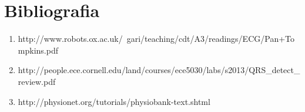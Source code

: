 \chapter{Bibliografia}

\vspace*{1cm}

\begin{enumerate}[\lbrack 1\rbrack]
	\item http://www.robots.ox.ac.uk/~gari/teaching/cdt/A3/readings/ECG/Pan+Tompkins.pdf \label{bib:algorithm} \newline
	
	\item http://people.ece.cornell.edu/land/courses/ece5030/labs/s2013/QRS\_detect\_review.pdf \label{bib:method}
	
	\item http://physionet.org/tutorials/physiobank-text.shtml \label{bib:physio} \newline
	
\end{enumerate}

